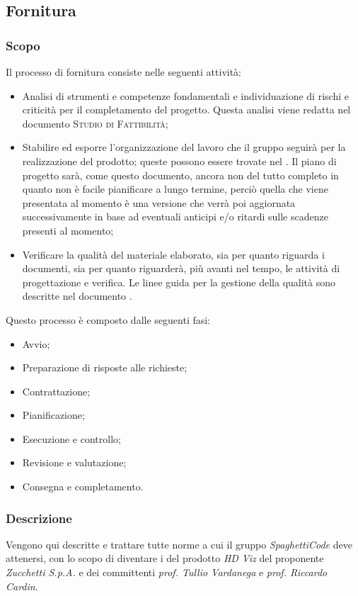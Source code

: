 \documentclass[../norme-di-progetto.tex]{subfiles}
\begin{document}
    
\subsection{Fornitura}
\subsubsection{Scopo}
Il processo di fornitura consiste nelle seguenti attività:
\begin{itemize}
    \item Analisi di strumenti e competenze fondamentali e individuazione di rischi e criticità per il completamento del progetto. Questa analisi viene redatta nel documento \textsc{Studio di Fattibilità};
    \item Stabilire ed esporre l'organizzazione del lavoro che il gruppo seguirà per la realizzazione del prodotto; queste possono essere trovate nel . Il piano di progetto sarà, come questo documento, ancora non del tutto completo in quanto non è facile pianificare a lungo termine, perciò quella che viene presentata al momento è una versione che verrà poi aggiornata successivamente in base ad eventuali anticipi e/o ritardi sulle scadenze presenti al momento;
    \item Verificare la qualità del materiale elaborato, sia per quanto riguarda i documenti, sia per quanto riguarderà, più avanti nel tempo, le attività di progettazione e verifica. Le linee guida per la gestione della qualità sono descritte nel documento .
\end{itemize}

\setlength{\parindent}{0pt}Questo processo è composto dalle seguenti fasi:
\begin{itemize}
    \item Avvio;
    \item Preparazione di risposte alle richieste;
    \item Contrattazione;
    \item Pianificazione;
    \item Esecuzione e controllo;
    \item Revisione e valutazione;
    \item Consegna e completamento.
\end{itemize}

\subsubsection{Descrizione}
Vengono qui descritte e trattare tutte norme a cui il gruppo \emph{SpaghettiCode} deve attenersi, con lo scopo di diventare i  del prodotto \emph{HD Viz} del proponente \emph{Zucchetti S.p.A.} e dei committenti \emph{prof. Tullio Vardanega} e \emph{prof. Riccardo Cardin}.
\end{document}
